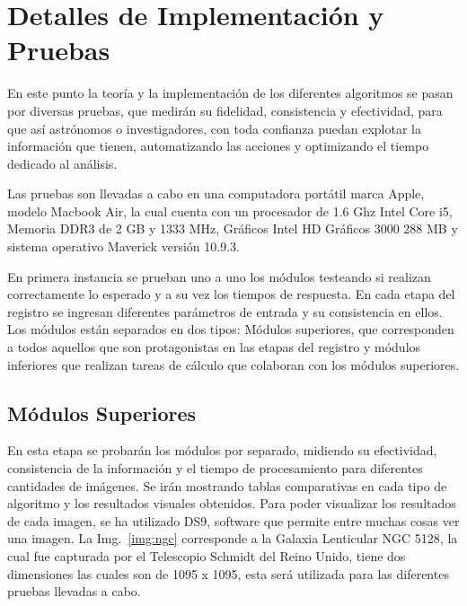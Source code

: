 \section{Detalles de Implementación y Pruebas}

En este punto la teoría y la implementación de los diferentes algoritmos se pasan por diversas pruebas, que medirán su fidelidad, consistencia y efectividad, para que así astrónomos o investigadores, con toda confianza puedan explotar la información que tienen, automatizando las acciones y optimizando el tiempo dedicado al análisis.  

Las pruebas son llevadas a cabo en una computadora portátil marca Apple, modelo Macbook Air, la cual cuenta con un procesador de 1.6 Ghz Intel Core i5, Memoria DDR3 de 2 GB y 1333 MHz, Gráficos Intel HD Gráficos 3000 288 MB y sistema operativo Maverick versión 10.9.3.  

En primera instancia se prueban uno a uno los módulos testeando si realizan correctamente lo esperado y a su vez los tiempos de respuesta. En cada etapa del registro se ingresan diferentes parámetros de entrada y su consistencia en ellos. Los módulos están separados en dos tipos: Módulos superiores, que corresponden a todos aquellos que son protagonistas en las etapas del registro y módulos inferiores que realizan tareas de cálculo que colaboran con los módulos superiores.  

\subsection{Módulos Superiores}

En esta etapa se probarán los módulos por separado, midiendo su efectividad, consistencia de la información y el tiempo de procesamiento para diferentes cantidades de imágenes. Se irán mostrando tablas comparativas en cada tipo de algoritmo y los resultados visuales obtenidos. Para poder visualizar los resultados de cada imagen, se ha utilizado DS9, software que permite entre muchas cosas ver una imagen. La Img.~\ref{img:ngc} corresponde a la Galaxia Lenticular NGC 5128, la cual fue capturada por el Telescopio Schmidt del Reino Unido, tiene dos dimensiones las cuales son de 1095 x 1095, esta será utilizada para las diferentes pruebas llevadas a cabo.

